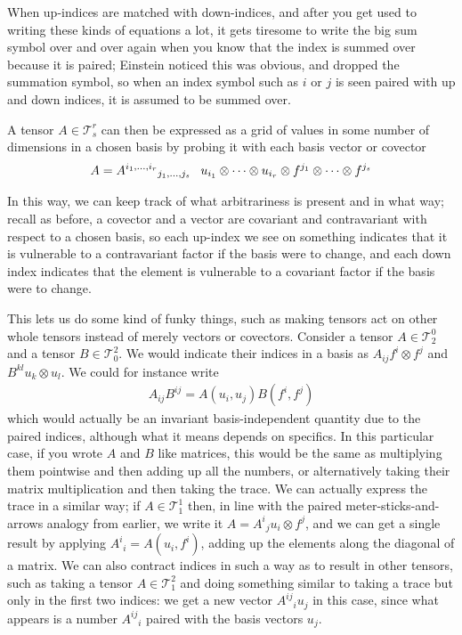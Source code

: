 \documentclass[11pt]{article}
\begin{document}
When up-indices are matched with down-indices, and after you get used to writing these kinds of equations a lot, it gets tiresome to write the big sum symbol over and over again when you know that the index is summed over because it is paired; Einstein noticed this was obvious, and dropped the summation symbol, so when an index symbol such as $i$ or $j$ is seen paired with up and down indices, it is assumed to be summed over.

A tensor $A \in \mathcal T_s^r$ can then be expressed as a grid of values in some number of dimensions in a chosen basis by probing it with each basis vector or covector \begin{gather*}
A = \LARGE{{A^{i_1, \dots, i_r}}_{j_1, \dots, j_s}} \hspace{0.5em}u_{i_1} \otimes \dots \otimes u_{i_r} \otimes f^{j_1} \otimes \dots \otimes f^{j_s}
\end{gather*}

In this way, we can keep track of what arbitrariness is present and in what way; recall as before, a covector and a vector are covariant and contravariant with respect to a chosen basis, so each up-index we see on something indicates that it is vulnerable to a contravariant factor if the basis were to change, and each down index indicates that the element is vulnerable to a covariant factor if the basis were to change.

This lets us do some kind of funky things, such as making tensors act on other whole tensors instead of merely vectors or covectors. Consider a tensor $A \in \mathcal T_2^0$ and a tensor $B \in \mathcal T_0^2$. We would indicate their indices in a basis as $A_{ij} f^i \otimes f^j$ and $B^{kl} u_k \otimes u_l$. We could for instance write \begin{gather*}
A_{ij} B^{ij} = A(u_i, u_j) B(f^i, f^j)
\end{gather*}
which would actually be an invariant basis-independent quantity due to the paired indices, although what it means depends on specifics. In this particular case, if you wrote $A$ and $B$ like matrices, this would be the same as multiplying them pointwise and then adding up all the numbers, or alternatively taking their matrix multiplication and then taking the trace. We can actually express the trace in a similar way; if $A \in \mathcal T_1^1$ then, in line with the paired meter-sticks-and-arrows analogy from earlier, we write it $A = {A^i}_j u_i \otimes f^j$, and we can get a single result by applying ${A^i}_i = A(u_i,f^i)$, adding up the elements along the diagonal of a matrix. We can also contract indices in such a way as to result in other tensors, such as taking a tensor $A \in \mathcal T_1^2$ and doing something similar to taking a trace but only in the first two indices: we get a new vector ${A^{ij}}_i u_j$ in this case, since what appears is a number ${A^{ij}}_i$ paired with the basis vectors $u_j$.
\end{document}
